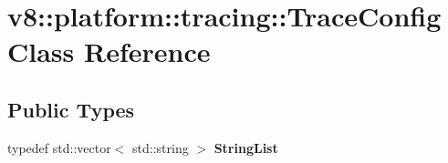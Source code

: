 \hypertarget{classv8_1_1platform_1_1tracing_1_1TraceConfig}{}\section{v8\+:\+:platform\+:\+:tracing\+:\+:Trace\+Config Class Reference}
\label{classv8_1_1platform_1_1tracing_1_1TraceConfig}
\subsection*{Public Types}
\begin{DoxyCompactItemize}
\item 
\mbox{\label{classv8_1_1platform_1_1tracing_1_1TraceConfig_a2199ea01bbf74ccc851e2d777223048f}} 
typedef std\+::vector$<$ std\+::string $>$ {\bfseries String\+List}
\end{DoxyCompactItemize}
